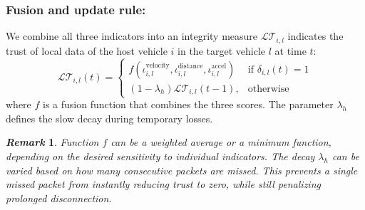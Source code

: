 \documentclass{ifacconf}
\def\LT{\mathcal{LT}} %
\newtheorem{remark}{\it \textbf{Remark}}%
\begin{document}
\subsubsection{Fusion and update rule:}
We combine all three indicators into an integrity measure $\LT_{i,l}$ indicates the trust of local data of the host vehicle $i$ in the target vehicle $l$ at time $t$:
\begin{equation}
    \LT_{i,l}(t) = 
    \left\{ \begin{array}{lc}
        f (\iota_{i,l}^{\text{velocity}}, \iota_{i,l}^{\text{distance}} ,\iota_{i,l}^{\text{accel}})  &  \text{if } \delta_{i,l}(t) = 1 \\
        (1 - \lambda_h)\LT_{i,l}(t-1), & \text{otherwise}
    \end{array}\right.
\end{equation}
where $f$ is a fusion function that combines the three scores.
The parameter $\lambda_h$ defines the slow decay during temporary losses.
\begin{remark}
    Function $f$ can be a weighted average or a minimum function, depending on the desired sensitivity to individual indicators.
    The decay $\lambda_h$ can be varied based on how many consecutive packets are missed.
    This prevents a single missed packet from instantly reducing trust to zero, while still penalizing prolonged disconnection.
\end{remark}
\end{document}
